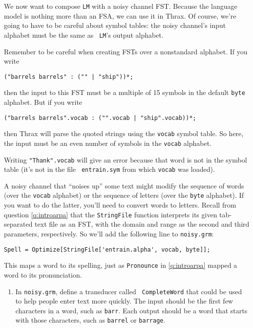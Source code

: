 \documentclass[11pt]{article}
\begin{document}
\begin{enumerate}[resume]
\begin{enumerate}
  \end{enumerate}

  We now want to compose {\tt LM} with a noisy channel FST.  Because
  the language model is nothing more than an FSA, we can use it in
  Thrax. Of course, we're going to have to be careful about symbol
  tables: the noisy channel's input alphabet must be the same as {\tt
    LM}'s output alphabet.

  Remember to be careful when creating FSTs over a nonstandard
  alphabet. If you write
\begin{verbatim}
("barrels barrels" : ("" | "ship"))*;
\end{verbatim}
  then the input to this FST must be a multiple of 15 symbols in
  the default {\tt byte} alphabet.  But if you write
\begin{verbatim}
("barrels barrels".vocab : ("".vocab | "ship".vocab))*;
\end{verbatim}
  then Thrax will parse the quoted strings using the {\tt vocab} symbol
  table.  So here, the input must be an even number of symbols
  in the {\tt vocab} alphabet.

  Writing {\tt "Thank".vocab} will give an error because that word
  is not in the symbol table (it's not in the file {\tt
    entrain.sym} from which {\tt vocab} was loaded).

  A noisy channel that ``noises up'' some text might modify the
  sequence of words (over the {\tt vocab} alphabet) or the sequence of
  letters (over the {\tt byte} alphabet).  If you want to do the
  latter, you'll need to convert words to letters.  Recall from
  question \ref{q:introarpa} that the \texttt{StringFile} function
  interprets its given tab-separated text file as an FST, with the
  domain and range as the second and third parameters, respectively.
  So we'll add the following line to \texttt{noisy.grm}:
\begin{verbatim}
Spell = Optimize[StringFile['entrain.alpha', vocab, byte]];
\end{verbatim}

  This maps a word to its spelling, just as {\tt Pronounce} in
  \ref{q:introarpa} mapped a word to its pronunciation.

  \begin{enumerate}[resume]
  \item
    In {\tt noisy.grm}, define a transducer called {\tt
      CompleteWord} that could be used to help people enter text
    more quickly.  The input should be the first few characters in a
    word, such as {\tt barr}.  Each output should be a word that
    starts with those characters, such as {\tt barrel} or {\tt barrage}.


\end{enumerate}
\end{enumerate}
\end{document}
